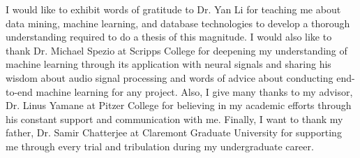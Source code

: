 \doublespacing
\setlength{\parindent}{1cm}


I would like to exhibit words of gratitude to Dr. Yan Li for teaching me about data mining, machine learning, and database technologies to develop a thorough understanding required to do a thesis of this magnitude. I would also like to thank Dr. Michael Spezio at Scripps College for deepening my understanding of machine learning through its application with neural signals and sharing his wisdom about audio signal processing and words of advice about conducting end-to-end machine learning for any project. Also, I give many thanks to my advisor, Dr. Linus Yamane at Pitzer College for believing in my academic efforts through his constant support and communication with me. Finally, I want to thank my father, Dr. Samir Chatterjee at Claremont Graduate University for supporting me through every trial and tribulation during my undergraduate career. 

